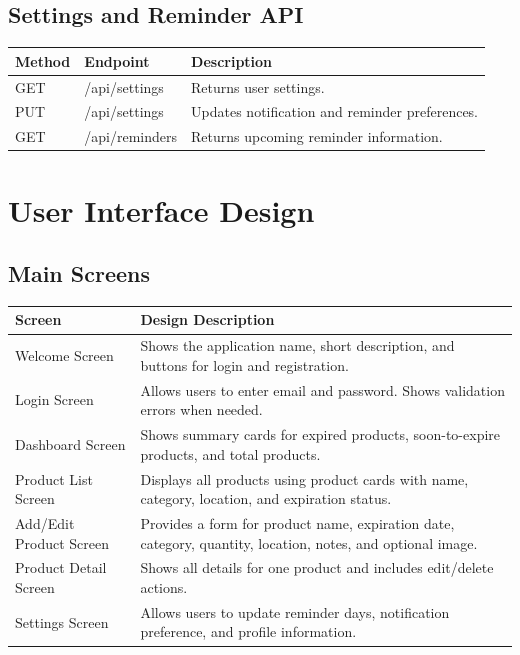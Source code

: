 \documentclass[12pt]{article}
\begin{document}
\subsection{Settings and Reminder API}
\begin{longtable}{|p{}|p{}|p{}|}
\hline
\textbf{Method} & \textbf{Endpoint} & \textbf{Description} \\
\hline
GET & /api/settings & Returns user settings. \\
\hline
PUT & /api/settings & Updates notification and reminder preferences. \\
\hline
GET & /api/reminders & Returns upcoming reminder information. \\
\hline
\end{longtable}

\section{User Interface Design}

\subsection{Main Screens}
\begin{longtable}{|p{}|p{}|}
\hline
\textbf{Screen} & \textbf{Design Description} \\
\hline
Welcome Screen & Shows the application name, short description, and buttons for login and registration. \\
\hline
Login Screen & Allows users to enter email and password. Shows validation errors when needed. \\
\hline
Dashboard Screen & Shows summary cards for expired products, soon-to-expire products, and total products. \\
\hline
Product List Screen & Displays all products using product cards with name, category, location, and expiration status. \\
\hline
Add/Edit Product Screen & Provides a form for product name, expiration date, category, quantity, location, notes, and optional image. \\
\hline
Product Detail Screen & Shows all details for one product and includes edit/delete actions. \\
\hline
Settings Screen & Allows users to update reminder days, notification preference, and profile information. \\
\hline
\end{longtable}
\end{document}
